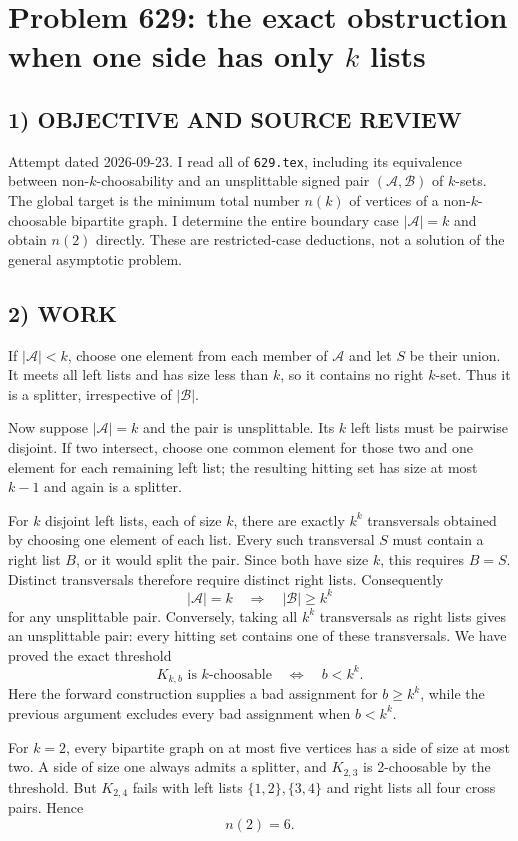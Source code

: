 \section{Problem 629: the exact obstruction when one side has only $k$ lists}
\subsection*{1) OBJECTIVE AND SOURCE REVIEW}
Attempt dated 2026-09-23. I read all of \texttt{629.tex}, including its equivalence between non-$k$-choosability and an unsplittable signed pair $(\mathcal A,\mathcal B)$ of $k$-sets. The global target is the minimum total number $n(k)$ of vertices of a non-$k$-choosable bipartite graph. I determine the entire boundary case $|\mathcal A|=k$ and obtain $n(2)$ directly. These are restricted-case deductions, not a solution of the general asymptotic problem.
\subsection*{2) WORK}
If $|\mathcal A|<k$, choose one element from each member of $\mathcal A$ and let $S$ be their union. It meets all left lists and has size less than $k$, so it contains no right $k$-set. Thus it is a splitter, irrespective of $|\mathcal B|$.

Now suppose $|\mathcal A|=k$ and the pair is unsplittable. Its $k$ left lists must be pairwise disjoint. If two intersect, choose one common element for those two and one element for each remaining left list; the resulting hitting set has size at most $k-1$ and again is a splitter.

For $k$ disjoint left lists, each of size $k$, there are exactly $k^k$ transversals obtained by choosing one element of each list. Every such transversal $S$ must contain a right list $B$, or it would split the pair. Since both have size $k$, this requires $B=S$. Distinct transversals therefore require distinct right lists. Consequently
\[
|\mathcal A|=k\quad\Longrightarrow\quad |\mathcal B|\ge k^k
\]
for any unsplittable pair. Conversely, taking all $k^k$ transversals as right lists gives an unsplittable pair: every hitting set contains one of these transversals. We have proved the exact threshold
\[
K_{k,b}\text{ is }k\text{-choosable}\quad\Longleftrightarrow\quad b<k^k.
\]
Here the forward construction supplies a bad assignment for $b\ge k^k$, while the previous argument excludes every bad assignment when $b<k^k$.

For $k=2$, every bipartite graph on at most five vertices has a side of size at most two. A side of size one always admits a splitter, and $K_{2,3}$ is 2-choosable by the threshold. But $K_{2,4}$ fails with left lists $\{1,2\},\{3,4\}$ and right lists all four cross pairs. Hence
\[
n(2)=6.
\]
